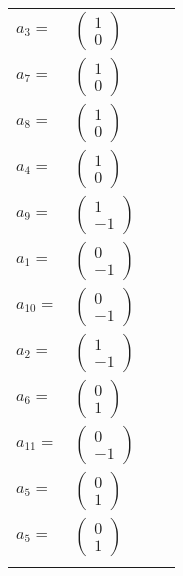 \documentclass[1p]{elsarticle_modified}
\theoremstyle{definition}
\begin{document}
\begin{tabular}{m{7pt} m{180pt} m{7pt} m{180pt} }
\flushright $a_{3}=$&$\begin{pmatrix}1\\0\end{pmatrix}$ \\
\flushright $a_{7}=$&$\begin{pmatrix}1\\0\end{pmatrix}$ \\
\flushright $a_{8}=$&$\begin{pmatrix}1\\0\end{pmatrix}$ \\
\flushright $a_{4}=$&$\begin{pmatrix}1\\0\end{pmatrix}$ \\
\flushright $a_{9}=$&$\begin{pmatrix}1\\-1\end{pmatrix}$ \\
\flushright $a_{1}=$&$\begin{pmatrix}0\\-1\end{pmatrix}$ \\
\flushright $a_{10}=$&$\begin{pmatrix}0\\-1\end{pmatrix}$ \\
\flushright $a_{2}=$&$\begin{pmatrix}1\\-1\end{pmatrix}$ \\
\flushright $a_{6}=$&$\begin{pmatrix}0\\1\end{pmatrix}$ \\
\flushright $a_{11}=$&$\begin{pmatrix}0\\-1\end{pmatrix}$ \\
\flushright $a_{5}=$&$\begin{pmatrix}0\\1\end{pmatrix}$\\ \flushright $a_{5}=$&$\begin{pmatrix}0\\1\end{pmatrix}$\\&\end{tabular}
\end{document}

